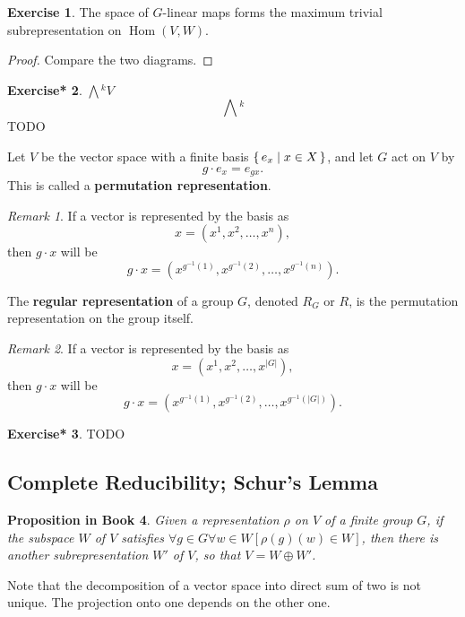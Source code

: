 \documentclass[12pt, letterpaper]{article}
\newcommand{\Hom}{\operatorname{Hom}}
\newcommand{\ext}[1]{\bigwedge\!^{#1}}
\newcommand{\red}[1]{{\color{red} #1}}
\newcommand{\card}[1]{\left\lvert #1 \right\rvert}
\theoremstyle{definition}
\theoremstyle{remark}
\newtheorem*{rem*}{Remark}
\theoremstyle{definition}
\newtheorem{exe}{Exercise}[section]
\newtheorem{exe*}[exe]{Exercise*}
\theoremstyle{plain}
\newtheorem{pprop}[exe]{Proposition in Book}
\numberwithin{equation}{section}
\begin{document}
	\begin{exe}
		The space of $G$-linear maps forms the maximum trivial subrepresentation on $\Hom(V,W)$.
	\end{exe}
	\begin{proof}
		Compare the two diagrams.
	\end{proof}

	\begin{exe*}
		$\ext{k}V$
		\[\ext{k}\]
		\red{TODO}
	\end{exe*}
	\begin{def*}
		Let $V$ be the vector space with a finite basis $\set{e_x| x\in  X}$, and 
		let $G$ act on $V$ by
		\[g\cdot e_x = e_{gx}.\]
		This is called a \textbf{permutation representation}.
	\end{def*}
	\begin{rem*}
		If a vector is represented by the basis as
		\[x=(x^1,x^2,\dots,x^n),\]
		then $g\cdot x$ will be
		\[g\cdot x=(x^{g^{-1}(1)},x^{g^{-1}(2)},\dots,x^{g^{-1}(n)}).\]
	\end{rem*}
	\begin{def*}
		The \textbf{regular representation} of a group $G$, denoted $R_G$ or $R$, 
		is the permutation representation on the group itself.
	\end{def*}
	\begin{rem*}
		If a vector is represented by the basis as
		\[x=(x^1,x^2,\dots,x^{\card{G}}),\]
		then $g\cdot x$ will be
		\[g\cdot x=(x^{g^{-1}(1)},x^{g^{-1}(2)},\dots,x^{g^{-1}(\card{G})}).\]
	\end{rem*}
	\begin{exe*}
		\red{TODO}
	\end{exe*}
	\subsection{Complete Reducibility; Schur's Lemma}
	\begin{pprop}
		Given a representation $\rho$ on $V$ of a finite 
		group $G$, if the subspace $W$ of $V$ satisfies
		$\forall g \in G\forall w \in W[\rho(g)(w)\in W]$,
		then there is another subrepresentation $W'$ of $V$, so that 
		$V= W\oplus W'$.
	\end{pprop}
	Note that the decomposition of a vector space into direct sum of two is not unique.
	The projection onto one depends on the other one.
	
\end{document}
